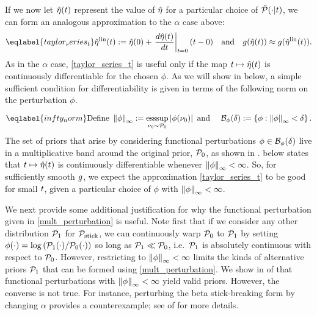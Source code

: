 If we now let $\hat\eta(t)$ represent the value of $\hat\eta$ for a particular
choice of $\tilde{\mathcal{P}}(\cdot \vert t)$, we can form an analogous approximation to the
$\alpha$ case above:
%
\begin{align} \eqlabel{taylor_series_t}
%
\etalin(\t) :=
    \etaopt(0) +
    \fracat{d\etaopt(t)}{dt}{\t=0} (\t - 0)
\mathand
g(\etaopt(\t)) \approx g(\etalin(\t)).
%
\end{align}
%
As in the $\alpha$ case, \eqref{taylor_series_t} is useful only if the map $t
\mapsto \hat\eta(t)$ is continuously differentiable for the chosen $\phi$.  As we
will show in  below, a simple sufficient condition for
differentiability is given in terms of the following norm on the perturbation
$\phi$.

\begin{equation} \eqlabel{infty_norm}
    \textrm{Define }
	\norminf{\phi} := \esssup_{\nu_0 \sim \pbase} \abs{\phi(\nu_0)}
    \textrm{ and }
	\quad \ball_\phi(\delta) := \left\{ \phi: \norminf{\phi} <
\delta \right\}.
\end{equation}
%
The set of priors that arise by considering functional perturbations $\phi \in
\mathcal{B}_\phi(\delta)$ live in a multiplicative band around the original prior,
$\mathcal{P}_{0}$, as shown in .   below states
that $t \mapsto \hat\eta(t)$ is continuously differentiable whenever
$\left\Vert\phi\right\Vert_{\infty} < \infty$.  So, for sufficiently smooth $g$, we expect the
approximation \eqref{taylor_series_t} to be good for small $t$, given a
particular choice of $\phi$ with $\left\Vert\phi\right\Vert_{\infty} < \infty$.

We next provide some additional justification for why the functional
perturbation given in \eqref{mult_perturbation} is useful. Note first that if we
consider any other distribution $\mathcal{P}_{1}$ for $\mathcal{P}_{\mathrm{stick}}$, we can continuously warp
$\mathcal{P}_{0}$ to $\mathcal{P}_{1}$ by setting $\phi(\cdot) = \log \left( \mathcal{P}_{1}(\cdot) /
\mathcal{P}_{0}(\cdot) \right)$ so long as $\mathcal{P}_{1} \ll \mathcal{P}_{0}$, i.e.\ $\mathcal{P}_{1}$ is
absolutely continuous with respect to $\mathcal{P}_{0}$.
%
However, restricting to $\left\Vert\phi\right\Vert_{\infty} < \infty$ limits the kinds of
alternative priors $\mathcal{P}_{1}$ that can be formed using \eqref{mult_perturbation}.
We show in  of  that
functional perturbations with $\left\Vert\phi\right\Vert_{\infty} < \infty$ yield valid priors.
However, the converse is not true. For instance, perturbing the beta
stick-breaking form by changing $\alpha$ provides a counterexample; see
 of  for more details.

